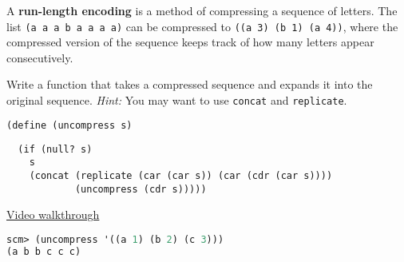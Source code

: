 \question A \textbf{run-length encoding} is a method of compressing a sequence
of letters. The list \texttt{(a a a b a a a a)} can be compressed to \texttt{((a
  3) (b 1) (a 4))}, where the compressed version of the sequence keeps track of
how many letters appear consecutively.

Write a function that takes a compressed sequence and expands it into the
original sequence.
\textit{Hint:} You may want to use \texttt{concat} and \texttt{replicate}.

\begin{lstlisting}[language=Scheme]
(define (uncompress s)
\end{lstlisting}
\begin{solution}[1in]
\begin{lstlisting}
  (if (null? s)
    s
    (concat (replicate (car (car s)) (car (cdr (car s))))
            (uncompress (cdr s)))))
\end{lstlisting}
\href{https://youtu.be/8FO2ZYkXwb0?t=10m27s}{Video walkthrough}
\end{solution}
\begin{lstlisting}[language=Scheme]
scm> (uncompress '((a 1) (b 2) (c 3)))
(a b b c c c)
\end{lstlisting}
